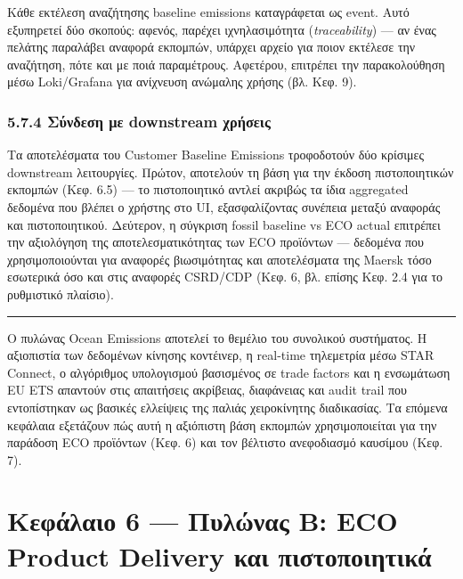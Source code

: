 Κάθε εκτέλεση αναζήτησης baseline emissions καταγράφεται ως event. Αυτό
εξυπηρετεί δύο σκοπούς: αφενός, παρέχει ιχνηλασιμότητα
(\emph{traceability}) --- αν ένας πελάτης παραλάβει αναφορά εκπομπών,
υπάρχει αρχείο για ποιον εκτέλεσε την αναζήτηση, πότε και με ποιά
παραμέτρους. Αφετέρου, επιτρέπει την παρακολούθηση μέσω Loki/Grafana για
ανίχνευση ανώμαλης χρήσης (βλ. Κεφ. 9).

\subsection{5.7.4 Σύνδεση με downstream
χρήσεις}\label{ux3c3ux3cdux3bdux3b4ux3b5ux3c3ux3b7-ux3bcux3b5-downstream-ux3c7ux3c1ux3aeux3c3ux3b5ux3b9ux3c2}

Τα αποτελέσματα του Customer Baseline Emissions τροφοδοτούν δύο κρίσιμες
downstream λειτουργίες. Πρώτον, αποτελούν τη βάση για την έκδοση
πιστοποιητικών εκπομπών (Κεφ. 6.5) --- το πιστοποιητικό αντλεί ακριβώς
τα ίδια aggregated δεδομένα που βλέπει ο χρήστης στο UI, εξασφαλίζοντας
συνέπεια μεταξύ αναφοράς και πιστοποιητικού. Δεύτερον, η σύγκριση fossil
baseline vs ECO actual επιτρέπει την αξιολόγηση της αποτελεσματικότητας
των ECO προϊόντων --- δεδομένα που χρησιμοποιούνται για αναφορές
βιωσιμότητας και αποτελέσματα της Maersk τόσο εσωτερικά όσο και στις
αναφορές CSRD/CDP (Κεφ. 6, βλ. επίσης Κεφ. 2.4 για το ρυθμιστικό
πλαίσιο).

\begin{center}\rule{0.5\linewidth}{0.5pt}\end{center}

Ο πυλώνας Ocean Emissions αποτελεί το θεμέλιο του συνολικού συστήματος.
Η αξιοπιστία των δεδομένων κίνησης κοντέινερ, η real-time τηλεμετρία
μέσω STAR Connect, ο αλγόριθμος υπολογισμού βασισμένος σε trade factors
και η ενσωμάτωση EU ETS απαντούν στις απαιτήσεις ακρίβειας, διαφάνειας
και audit trail που εντοπίστηκαν ως βασικές ελλείψεις της παλιάς
χειροκίνητης διαδικασίας. Τα επόμενα κεφάλαια εξετάζουν πώς αυτή η
αξιόπιστη βάση εκπομπών χρησιμοποιείται για την παράδοση ECO προϊόντων
(Κεφ. 6) και τον βέλτιστο ανεφοδιασμό καυσίμου (Κεφ. 7).

\pagebreak

\chapter{Κεφάλαιο 6 --- Πυλώνας Β: ECO Product Delivery και
πιστοποιητικά}\label{ux3baux3b5ux3c6ux3acux3bbux3b1ux3b9ux3bf-6-ux3c0ux3c5ux3bbux3ceux3bdux3b1ux3c2-ux3b2-eco-product-delivery-ux3baux3b1ux3b9-ux3c0ux3b9ux3c3ux3c4ux3bfux3c0ux3bfux3b9ux3b7ux3c4ux3b9ux3baux3ac}

